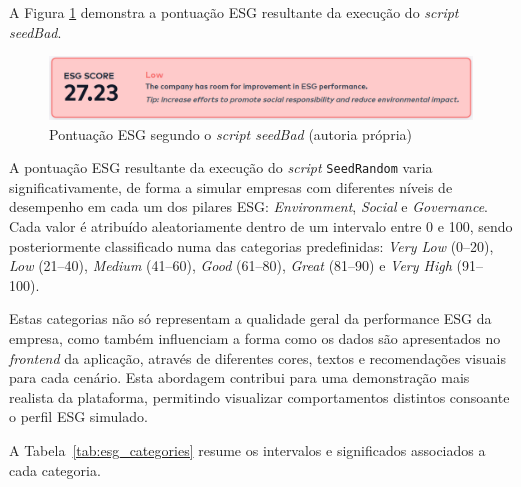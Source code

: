 A Figura \ref{fig:bad_esg} demonstra a pontuação ESG resultante da execução do \textit{script seedBad}.

\begin{figure}[H]
    \centering
    \includegraphics[width=\linewidth,keepaspectratio]{frontmatter/assets/platform_prints/seeding/bad_esg.png}
    \caption{Pontuação ESG segundo o \textit{script seedBad} (autoria própria)}
    \label{fig:bad_esg}
\end{figure}

A pontuação ESG resultante da execução do \textit{script} \texttt{SeedRandom} varia significativamente, de forma a simular empresas com diferentes níveis de desempenho em cada um dos pilares ESG: \textit{Environment}, \textit{Social} e \textit{Governance}. Cada valor é atribuído aleatoriamente dentro de um intervalo entre 0 e 100, sendo posteriormente classificado numa das categorias predefinidas: \textit{Very Low} (0--20), \textit{Low} (21--40), \textit{Medium} (41--60), \textit{Good} (61--80), \textit{Great} (81--90) e \textit{Very High} (91--100).

Estas categorias não só representam a qualidade geral da performance ESG da empresa, como também influenciam a forma como os dados são apresentados no \textit{frontend} da aplicação, através de diferentes cores, textos e recomendações visuais para cada cenário. Esta abordagem contribui para uma demonstração mais realista da plataforma, permitindo visualizar comportamentos distintos consoante o perfil ESG simulado.

A Tabela~\ref{tab:esg_categories} resume os intervalos e significados associados a cada categoria.

